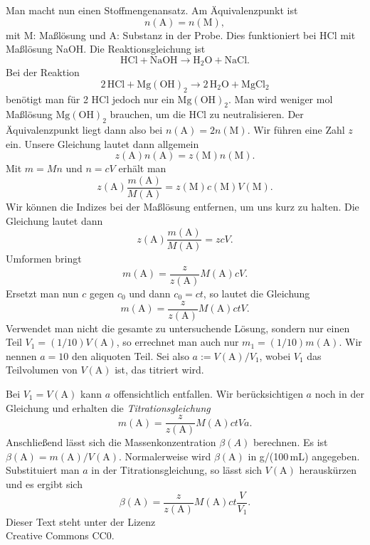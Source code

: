 \documentclass[a4paper,11pt,fleqn,twocolumn,dvipdfmx]{scrartcl}
\begin{document}
Man macht nun einen Stoffmengenansatz. Am Äquivalenzpunkt ist
\begin{equation}
n(\mathrm A)=n(\mathrm M),
\end{equation}
mit M: Maßlösung und A: Substanz in der Probe.
Dies funktioniert bei HCl mit Maßlösung NaOH.
Die Reaktionsgleichung ist
\begin{equation}
\mathrm{HCl + NaOH \longrightarrow H_2O + NaCl}.
\end{equation}
Bei der Reaktion
\begin{equation}
\mathrm{2\,HCl + Mg(OH)_2 \longrightarrow 2\,H_2O + MgCl_2}
\end{equation}
benötigt man für 2 HCl jedoch nur ein $\mathrm{Mg(OH)_2}$.
Man wird weniger mol Maßlösung $\mathrm{Mg(OH)_2}$ brauchen,
um die HCl zu neutralisieren. Der Äquivalenzpunkt liegt
dann also bei $n(\mathrm A)=2n(\mathrm M)$. Wir führen eine Zahl
$z$ ein. Unsere Gleichung lautet dann allgemein
\begin{equation}
z(\mathrm A)n(\mathrm A) = z(\mathrm M)n(\mathrm M).
\end{equation}
Mit $m=Mn$ und $n=cV$ erhält man
\begin{equation}
z(\mathrm A)\frac{m(\mathrm A)}{M(\mathrm A)}
= z(\mathrm M)c(\mathrm M)V(\mathrm M).
\end{equation}
Wir können die Indizes bei der Maßlösung entfernen, um
uns kurz zu halten. Die Gleichung lautet dann
\begin{equation}
z(\mathrm A)\frac{m(\mathrm A)}{M(\mathrm A)} = zcV.
\end{equation}
Umformen bringt
\begin{equation}
m(\mathrm A) = \frac{z}{z(\mathrm A)} M(\mathrm A) cV.
\end{equation}
Ersetzt man nun $c$ gegen $c_0$ und dann $c_0=ct$,
so lautet die Gleichung
\begin{equation}
m(\mathrm A) = \frac{z}{z(\mathrm A)} M(\mathrm A) ctV.
\end{equation}
Verwendet man nicht die gesamte zu untersuchende Lösung, sondern
nur einen Teil $V_1 = (1/10)V(\mathrm A)$, so errechnet man auch nur
$m_1 = (1/10)m(\mathrm A)$. Wir nennen $a=10$ den aliquoten Teil.
Sei also $a:=V(\mathrm A)/V_1$, wobei $V_1$ das Teilvolumen von
$V(\mathrm A)$ ist, das titriert wird.

Bei $V_1=V(\mathrm A)$ kann $a$ offensichtlich entfallen.
Wir berücksichtigen $a$ noch in der Gleichung und erhalten
die \emph{Titrationsgleichung}
\begin{equation}
m(\mathrm A) = \frac{z}{z(\mathrm A)} M(\mathrm A)ctVa.
\end{equation}
Anschließend lässt sich die Massenkonzentration $\beta(A)$ berechnen.
Es ist $\beta(\mathrm A) = m(\mathrm A)/V(\mathrm A)$.
Normalerweise wird $\beta(\mathrm A)$ in g/(100\,mL) angegeben.
Substituiert man $a$ in der Titrationsgleichung, so lässt sich
$V(\mathrm A)$ herauskürzen und es ergibt sich
\begin{equation}
\beta(\mathrm A) = \frac{z}{z(\mathrm A)} M(\mathrm A) ct\frac{V}{V_1}.
\end{equation}
{\small Dieser Text steht unter der Lizenz\\
Creative Commons CC0.}
\end{document}
